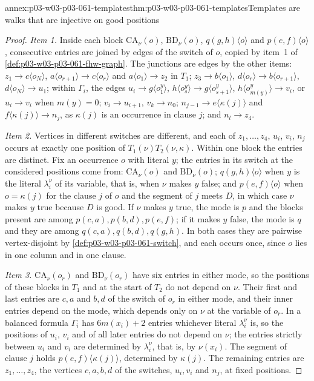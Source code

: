 \begin{annexitem}{annex:p03-w03-p03-061-templates}{thm:p03-w03-p03-061-templates}{Templates are walks that are injective on good positions}
\begin{proof}
\emph{Item 1.} Inside each block \(\mathrm{CA}_\nu(o)\), \(\mathrm{BD}_\nu(o)\),
\(q(g,h)\langle o\rangle\) and \(p(e,f)\langle o\rangle\), consecutive entries
are joined by edges of the switch of \(o\), copied by item~1 of
\cref{def:p03-w03-p03-061-fhw-graph}. The junctions are edges by the other
items: \(z_1\to c\langle o_N\rangle\), \(a\langle o_{r+1}\rangle\to
c\langle o_r\rangle\) and \(a\langle o_1\rangle\to z_2\) in \(T_1\);
\(z_3\to b\langle o_1\rangle\), \(d\langle o_r\rangle\to b\langle
o_{r+1}\rangle\), \(d\langle o_N\rangle\to u_1\); within \(\Gamma_i\), the
edges \(u_i\to g\langle o^y_1\rangle\), \(h\langle o^y_s\rangle\to
g\langle o^y_{s+1}\rangle\), \(h\langle o^y_{m(y)}\rangle\to v_i\), or
\(u_i\to v_i\) when \(m(y)=0\); \(v_i\to u_{i+1}\), \(v_k\to n_0\);
\(n_{j-1}\to e\langle\kappa(j)\rangle\) and \(f\langle\kappa(j)\rangle\to
n_j\), as \(\kappa(j)\) is an occurrence in clause \(j\); and \(n_l\to z_4\).

\emph{Item 2.} Vertices in different switches are different, and each of
\(z_1,\ldots,z_4\), \(u_i\), \(v_i\), \(n_j\) occurs at exactly one position
of \(T_1(\nu)T_2(\nu,\kappa)\). Within one block the entries are distinct.
Fix an occurrence \(o\) with literal \(y\); the entries in its switch at the
considered positions come from: \(\mathrm{CA}_\nu(o)\) and
\(\mathrm{BD}_\nu(o)\); \(q(g,h)\langle o\rangle\) when \(y\) is the literal
\(\lambda^\nu_i\) of its variable, that is, when \(\nu\) makes \(y\) false;
and \(p(e,f)\langle o\rangle\) when \(o=\kappa(j)\) for the clause \(j\) of
\(o\) and the segment of \(j\) meets \(D\), in which case \(\nu\) makes \(y\)
true because \(D\) is good. If \(\nu\) makes \(y\) true, the mode is \(p\) and
the blocks present are among \(p(c,a),p(b,d),p(e,f)\); if it makes \(y\)
false, the mode is \(q\) and they are among \(q(c,a),q(b,d),q(g,h)\). In both
cases they are pairwise vertex-disjoint by
\cref{def:p03-w03-p03-061-switch}, and each occurs once, since \(o\) lies in
one column and in one clause.

\emph{Item 3.} \(\mathrm{CA}_\nu(o_r)\) and \(\mathrm{BD}_\nu(o_r)\) have six
entries in either mode, so the positions of these blocks in \(T_1\) and at
the start of \(T_2\) do not depend on \(\nu\). Their first and last entries are
\(c,a\) and \(b,d\) of the switch of \(o_r\) in either mode, and their inner
entries depend on the mode, which depends only on \(\nu\) at the variable of
\(o_r\). In a balanced formula \(\Gamma_i\) has \(6m(x_i)+2\) entries whichever
literal \(\lambda^\nu_i\) is, so the positions of \(u_i\), \(v_i\) and of all
later entries do not depend on \(\nu\); the entries strictly between \(u_i\)
and \(v_i\) are determined by \(\lambda^\nu_i\), that is, by \(\nu(x_i)\). The
segment of clause \(j\) holds \(p(e,f)\langle\kappa(j)\rangle\), determined
by \(\kappa(j)\). The remaining entries are \(z_1,\ldots,z_4\), the vertices
\(c,a,b,d\) of the switches, \(u_i,v_i\) and \(n_j\), at fixed positions.
\end{proof}
\end{annexitem}

